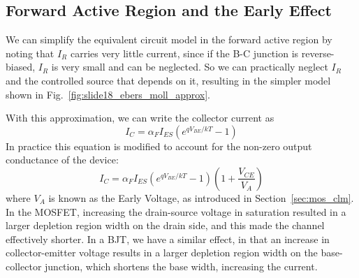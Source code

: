 \subsection{Forward Active Region and the Early Effect}
We can simplify the equivalent circuit model in the forward active region by noting that $I_R$ carries very little current, since if the B-C junction is reverse-biased, $I_R$ is very small and can be neglected.  So we can practically neglect $I_R$ and the controlled source that depends on it, resulting in the simpler model shown in Fig.~\ref{fig:slide18_ebers_moll_approx}.

With this approximation, we can write the collector current as
\begin{equation}
	I_C = \alpha_F I_{ES} \left( e^{qV_{BE}/kT} -1 \right)
\end{equation}
In practice this equation is modified to account for the non-zero output conductance of the device:
\begin{equation}
	I_C = \alpha_F I_{ES} \left( e^{qV_{BE}/kT} -1 \right) \left( 1 + \frac{V_{CE}}{V_A} \right)
\end{equation}
where $V_A$ is known as the Early Voltage, as introduced in Section~\ref{sec:mos_clm}.  In the MOSFET, increasing the drain-source voltage in saturation resulted in a larger depletion region width on the drain side, and this made the channel effectively shorter.  In a BJT, we have a similar effect, in that an increase in collector-emitter voltage results in a larger depletion region width on the base-collector junction, which shortens the base width, increasing the current.
